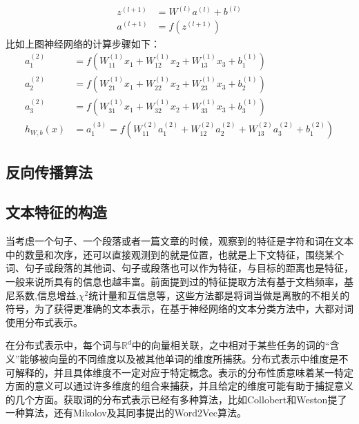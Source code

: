 \documentclass[UTF8]{ctexart}
\begin{document}
	\begin{align*} 
		z^{(l+1)} &= W^{(l)} a^{(l)} + b^{(l)} \\ a^{(l+1)} &= f(z^{(l+1)}) 
	\end{align*} 
	比如上图神经网络的计算步骤如下：
	\begin{align*} 
	a_1^{(2)} &= f(W_{11}^{(1)}x_1 + W_{12}^{(1)} x_2 + W_{13}^{(1)} x_3 + b_1^{(1)}) \\ a_2^{(2)} &= f(W_{21}^{(1)}x_1 + W_{22}^{(1)} x_2 + W_{23}^{(1)} x_3 + b_2^{(1)}) \\ a_3^{(2)} &= f(W_{31}^{(1)}x_1 + W_{32}^{(1)} x_2 + W_{33}^{(1)} x_3 + b_3^{(1)}) \\ h_{W,b}(x) &= a_1^{(3)} = f(W_{11}^{(2)}a_1^{(2)} + W_{12}^{(2)} a_2^{(2)} + W_{13}^{(2)} a_3^{(2)} + b_1^{(2)}) 
	\end{align*} 
	
\subsection{反向传播算法}


\subsection{文本特征的构造}
	当考虑一个句子、一个段落或者一篇文章的时候，观察到的特征是字符和词在文本中的数量和次序，还可以直接观测到的就是位置，也就是上下文特征，围绕某个词、句子或段落的其他词、句子或段落也可以作为特征，与目标的距离也是特征，一般来说所具有的信息也越丰富。前面提到过的特征提取方法有基于文档频率，基尼系数,信息增益,$\chi^2$统计量和互信息等，这些方法都是将词当做是离散的不相关的符号，为了获得更准确的文本表示，在基于神经网络的文本分类方法中，大都对词使用分布式表示。
	\par 在分布式表示中，每个词与$\mathbb{R}^d$中的向量相关联，之中相对于某些任务的词的“含义”能够被向量的不同维度以及被其他单词的维度所捕获。分布式表示中维度是不可解释的，并且具体维度不一定对应于特定概念。表示的分布性质意味着某一特定方面的意义可以通过许多维度的组合来捕获，并且给定的维度可能有助于捕捉意义的几个方面。获取词的分布式表示已经有多种算法，比如Collobert和Weston提了一种算法，还有Mikolov及其同事提出的Word2Vec算法。
\end{document}

